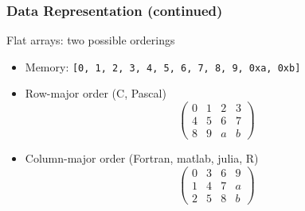 \documentclass[xcolor={rgb,x11names,svgnames},rgb,x11names,svgnames]{beamer}
\begin{document}
\begin{frame}[label=blasdata]
  \frametitle{Data Representation (continued)}

  \begin{block}{Flat arrays: two possible orderings}
    \begin{itemize}
    \item Memory: \texttt{[0, 1, 2, 3, 4, 5, 6, 7, 8, 9, 0xa, 0xb]}
    \item Row-major order (C, Pascal)
      \[
        \begin{pmatrix}
          0 & 1 & 2 & 3 \\
          4 & 5 & 6 & 7 \\
          8 & 9 & a & b
        \end{pmatrix}
      \]
      
    \item Column-major order (Fortran, matlab, julia, R)
      \[
        \begin{pmatrix}
          0 & 3 & 6 & 9 \\
          1 & 4 & 7 & a \\
          2 & 5 & 8 & b
        \end{pmatrix}
      \]
    \end{itemize}
  \end{block}
\end{frame}


\end{document}

